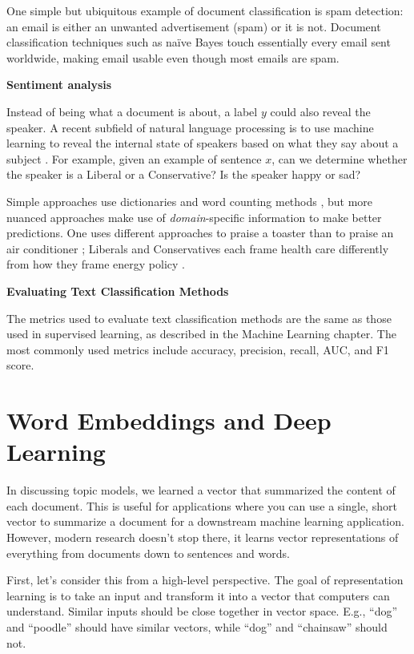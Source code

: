 \documentclass[]{krantz}
\begin{document}
One simple but ubiquitous example of document classification is spam
detection: an email is either an unwanted advertisement (spam) or it is
not. Document classification techniques such as naïve Bayes
\citep{lewis-05} touch essentially every email sent worldwide, making
email usable even though most emails are spam.

\textbf{Sentiment analysis}

Instead of being what a document is about, a label \(y\) could also
reveal the speaker. A recent subfield of natural language processing is
to use machine learning to reveal the internal state of speakers based
on what they say about a subject \citep{pang-08}. For example, given an
example of sentence \(x\), can we determine whether the speaker is a
Liberal or a Conservative? Is the speaker happy or sad?

Simple approaches use dictionaries and word counting methods
\citep{pennebaker-99}, but more nuanced approaches make use of
\emph{domain}-specific information to make better predictions. One uses
different approaches to praise a toaster than to praise an air
conditioner \citep{blitzer-07}; Liberals and Conservatives each frame
health care differently from how they frame energy policy
\citep{nguyen-13:shlda}.

\textbf{Evaluating Text Classification Methods}

The metrics used to evaluate text classification methods are the same as
those used in supervised learning, as described in the Machine Learning
chapter. The most commonly used metrics include accuracy, precision,
recall, AUC, and F1 score.

\section{Word Embeddings and Deep
Learning}\label{word-embeddings-and-deep-learning}

In discussing topic models, we learned a vector that summarized the
content of each document. This is useful for applications where you can
use a single, short vector to summarize a document for a downstream
machine learning application. However, modern research doesn't stop
there, it learns vector representations of everything from documents
down to sentences and words.

First, let's consider this from a high-level perspective. The goal of
representation learning \citep{bengio-13} is to take an input and
transform it into a vector that computers can understand. Similar inputs
should be close together in vector space. E.g., ``dog'' and ``poodle''
should have similar vectors, while ``dog'' and ``chainsaw'' should not.
\end{document}
